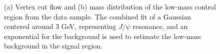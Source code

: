 \begin{figure}[!htb]
    \centering
    \caption{(a) Vertex cut flow and (b) mass distribution of the low-mass control region from the data sample. The combined fit of a Gaussian centered around $3$ GeV, representing $J/\psi$ resonance, and an exponential for the background is used to estimate the low-mass background in the signal region.}
    \label{fig:lowmass_control}
\end{figure}



